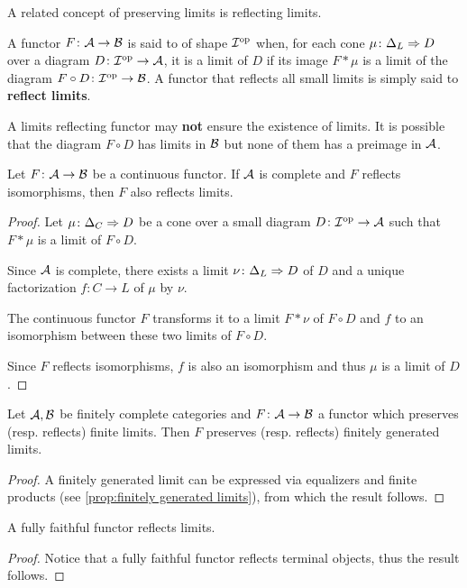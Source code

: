   A related concept of preserving limits is reflecting limits.
  \begin{defn}
    A functor $F \colon {\cal A} \to {\cal B}$ is said to  of shape ${\cal I}^{\operatorname{op}}$ when, for each cone $\mu\colon \Delta_L\Rightarrow D$ over a diagram $D\colon{\cal I}^{\operatorname{op}}\to{\cal A}$, it is a limit of $D$ if its image $F\ast\mu$ is a limit of the diagram $F\circ D\colon{\cal I}^{\operatorname{op}}\to{\cal B}$.
    A functor that reflects all small limits is simply said to \textbf{reflect limits}.
  \end{defn}
  \begin{rem}
    A limits reflecting functor may \textbf{not} ensure the existence of limits. It is possible that the diagram $F\circ D$ has limits in ${\cal B}$ but none of them has a preimage in ${\cal A}$.
  \end{rem}

  \begin{prop}
    Let $F\colon{\cal A}\to{\cal B}$ be a continuous functor. If ${\cal A}$ is complete and $F$ reflects isomorphisms, then $F$ also reflects limits.
  \end{prop}
  \begin{proof}
    Let $\mu\colon \Delta_C\Rightarrow D$ be a cone over a small diagram $D\colon{\cal I}^{\operatorname{op}}\to{\cal A}$ such that $F\ast\mu$ is a limit of $F\circ D$.

    Since ${\cal A}$ is complete, there exists a limit $\nu\colon \Delta_L\Rightarrow D$ of $D$ and a unique factorization $f\colon C\to L$ of $\mu$ by $\nu$.

    The continuous functor $F$ transforms it to a limit $F\ast\nu$ of $F\circ D$ and $f$ to an isomorphism between these two limits of $F\circ D$.

    Since $F$ reflects isomorphisms, $f$ is also an isomorphism and thus $\mu$ is a limit of $D$.
  \end{proof}

  \begin{prop}
    Let ${\cal A},{\cal B}$ be finitely complete categories and $F\colon{\cal A}\to{\cal B}$ a functor which preserves (resp. reflects) finite limits. Then $F$ preserves (resp. reflects) finitely generated limits.
  \end{prop}
  \begin{proof}
    A finitely generated limit can be expressed via equalizers and finite products (see \ref{prop:finitely generated limits}), from which the result follows.
  \end{proof}

  \begin{prop}
    A fully faithful functor reflects limits.
  \end{prop}
  \begin{proof}
    Notice that a fully faithful functor reflects terminal objects, thus the result follows.
  \end{proof}

